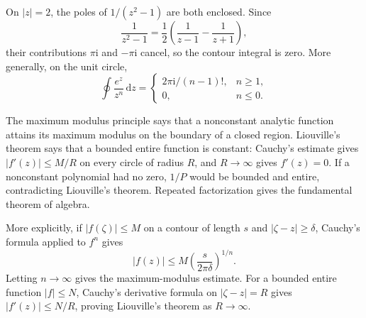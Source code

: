 \begin{example}
On $|z|=2$, the poles of $1/(z^2-1)$ are both enclosed. Since
\begin{equation}
\frac{1}{z^2-1}=\frac12\left(\frac{1}{z-1}-\frac{1}{z+1}\right),
\end{equation}
their contributions $\pi\mathrm{i}$ and $-\pi\mathrm{i}$ cancel, so the contour integral is zero. More generally, on the unit circle,
\begin{equation}
\oint\frac{e^z}{z^n}\,\mathrm{d}z=\begin{cases}
2\pi\mathrm{i}/(n-1)!,&n\geq1,\\0,&n\leq0.
\end{cases}
\end{equation}
\end{example}

The maximum modulus principle says that a nonconstant analytic function attains its maximum modulus on the boundary of a closed region. Liouville's theorem says that a bounded entire function is constant: Cauchy's estimate gives $|f'(z)|\leq M/R$ on every circle of radius $R$, and $R\to\infty$ gives $f'(z)=0$. If a nonconstant polynomial had no zero, $1/P$ would be bounded and entire, contradicting Liouville's theorem. Repeated factorization gives the fundamental theorem of algebra.

More explicitly, if $|f(\zeta)|\leq M$ on a contour of length $s$ and $|\zeta-z|\geq\delta$, Cauchy's formula applied to $f^n$ gives
\begin{equation}
|f(z)|\leq M\left(\frac{s}{2\pi\delta}\right)^{1/n}.
\end{equation}
Letting $n\to\infty$ gives the maximum-modulus estimate. For a bounded entire function $|f|\leq N$, Cauchy's derivative formula on $|\zeta-z|=R$ gives $|f'(z)|\leq N/R$, proving Liouville's theorem as $R\to\infty$.